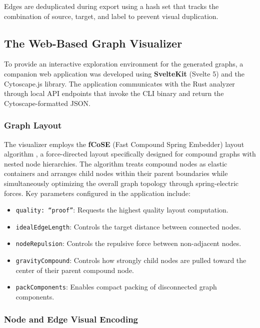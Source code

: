Edges are deduplicated during export using a hash set that tracks the combination of source, target, and label to prevent visual duplication.

\subsection{The Web-Based Graph Visualizer}

To provide an interactive exploration environment for the generated graphs, a companion web application was developed using \textbf{SvelteKit} (Svelte 5) \cite{TODO:svelte} and the Cytoscape.js library. The application communicates with the Rust analyzer through local API endpoints that invoke the CLI binary and return the Cytoscape-formatted JSON.

\subsubsection{Graph Layout}

The visualizer employs the \textbf{fCoSE} (Fast Compound Spring Embedder) layout algorithm \cite{TODO:fcose}, a force-directed layout specifically designed for compound graphs with nested node hierarchies. The algorithm treats compound nodes as elastic containers and arranges child nodes within their parent boundaries while simultaneously optimizing the overall graph topology through spring-electric forces. Key parameters configured in the application include:
\begin{itemize}
  \item \texttt{quality: ``proof''}: Requests the highest quality layout computation.
  \item \texttt{idealEdgeLength}: Controls the target distance between connected nodes.
  \item \texttt{nodeRepulsion}: Controls the repulsive force between non-adjacent nodes.
  \item \texttt{gravityCompound}: Controls how strongly child nodes are pulled toward the center of their parent compound node.
  \item \texttt{packComponents}: Enables compact packing of disconnected graph components.
\end{itemize}

\subsubsection{Node and Edge Visual Encoding}

